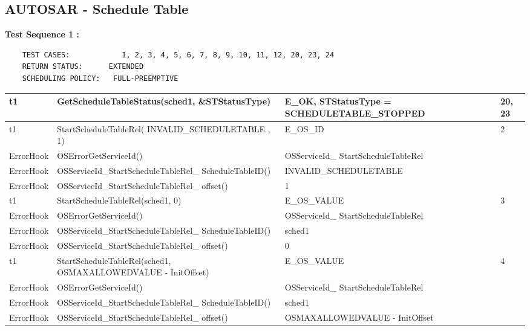 \documentclass[10pt]{article}
\newlength{\Li}\settowidth{\Li}{Running}
\newlength{\Lii}\setlength{\Lii}{7cm}
\newlength{\Liiii}\setlength{\Liiii}{0.9cm}
\newlength{\Liii}\setlength{\Liii}{\textwidth} \addtolength{\Liii}{-\Li} \addtolength{\Liii}{-\Lii} \addtolength{\Liii}{-\Liiii}
\begin{document}
\subsection{AUTOSAR - Schedule Table}

	\textbf{Test Sequence 1 :}
	\begin{lstlisting}
	TEST CASES:		       1, 2, 3, 4, 5, 6, 7, 8, 9, 10, 11, 12, 20, 23, 24
	RETURN STATUS:	  	EXTENDED
	SCHEDULING POLICY:   FULL-PREEMPTIVE
	\end{lstlisting}
	
	
	\begin{supertabular}{|p{\Li}|p{\Lii}|p{\Liii}|p{\Liiii}|} \hline 
	t1	& GetScheduleTableStatus(sched1, \&STStatusType)						& E\_OK, STStatusType = SCHEDULETABLE\_STOPPED		& 20, 23 \\ \hline
	t1	& StartScheduleTableRel( INVALID\_SCHEDULETABLE , 1)					& E\_OS\_ID											& 2 \\ \hline
	ErrorHook	& OSErrorGetServiceId()											& OSServiceId\_ StartScheduleTableRel						& \\ \hline
	ErrorHook	& OSServiceId\_StartScheduleTableRel\_ ScheduleTableID()				& INVALID\_SCHEDULETABLE							& \\ \hline
	ErrorHook	& OSServiceId\_StartScheduleTableRel\_ offset()						& 1													& \\ \hline
	
	t1	& StartScheduleTableRel(sched1, 0)									& E\_OS\_VALUE										& 3 \\ \hline
	ErrorHook	& OSErrorGetServiceId()											& OSServiceId\_ StartScheduleTableRel						& \\ \hline
	ErrorHook	& OSServiceId\_StartScheduleTableRel\_ ScheduleTableID()				& sched1												& \\ \hline
	ErrorHook	& OSServiceId\_StartScheduleTableRel\_ offset()						& 0													& \\ \hline
	
	t1	& StartScheduleTableRel(sched1, OSMAXALLOWEDVALUE - InitOffset)			& E\_OS\_VALUE										& 4 \\ \hline
	ErrorHook	& OSErrorGetServiceId()											& OSServiceId\_ StartScheduleTableRel						& \\ \hline
	ErrorHook	& OSServiceId\_StartScheduleTableRel\_ ScheduleTableID()				& sched1												& \\ \hline
	ErrorHook	& OSServiceId\_StartScheduleTableRel\_ offset()						& OSMAXALLOWEDVALUE - InitOffset						& \\ \hline
	

\end{supertabular}
\end{document}
